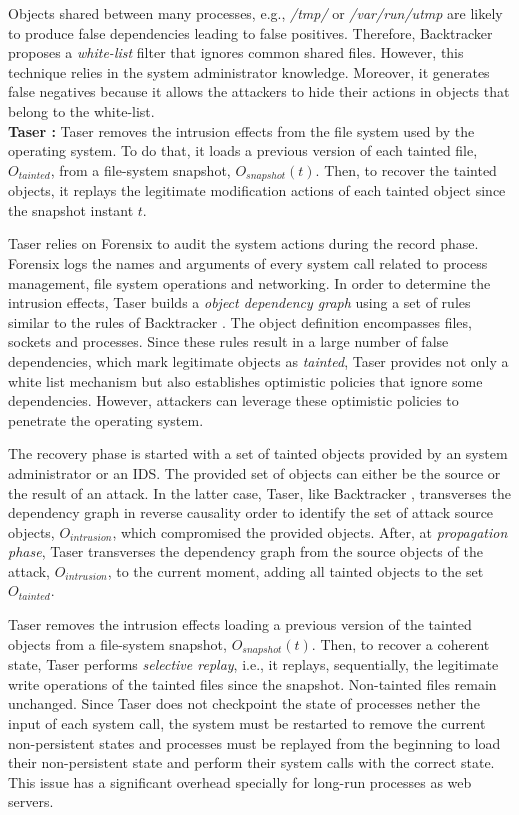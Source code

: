 Objects shared between many processes, e.g., \textit{/tmp/} or \textit{/var/run/utmp} are likely to produce false dependencies leading to false positives. Therefore, Backtracker proposes a \textit{white-list} filter that ignores common shared files. However, this technique relies in the system administrator knowledge. Moreover, it generates false negatives because it allows the attackers to hide their actions in objects that belong to the white-list. \\


\textbf{Taser \cite{taser}:} Taser removes the intrusion effects from the file system used by the operating system. To do that, it loads a previous version of each tainted file, $O_{tainted}$, from a file-system snapshot, $O_{snapshot}(t)$. Then, to recover the tainted objects, it replays the legitimate modification actions of each tainted object since the snapshot instant $t$.

Taser relies on Forensix \cite{forensix} to audit the system actions during the record phase. Forensix logs the names and arguments of every system call related to process management, file system operations and networking. In order to determine the intrusion effects, Taser builds a \textit{object dependency graph} using a set of rules similar to the rules of Backtracker \cite{backtracker}. The object definition encompasses files, sockets and processes. Since these rules result in a large number of false dependencies, which mark legitimate objects as \textit{tainted}, Taser provides not only a white list mechanism but also establishes optimistic policies that ignore some dependencies. However, attackers can leverage these optimistic policies to penetrate the operating system.

The recovery phase is started with a set of tainted objects provided by an system administrator or an \ac{IDS}. The provided set of objects can either be the source or the result of an attack. In the latter case, Taser, like Backtracker \cite{backtracker}, transverses the dependency graph in reverse causality order to identify the set of attack source objects, $O_{intrusion}$, which compromised the provided objects. After, at \textit{propagation phase}, Taser transverses the dependency graph from the source objects of the attack, $O_{intrusion}$, to the current moment, adding all tainted objects to the set $O_{tainted}$.

Taser removes the intrusion effects loading a previous version of the tainted objects from a file-system snapshot, $O_{snapshot}(t)$. Then, to recover a coherent state, Taser performs \textit{selective replay}, i.e., it replays, sequentially, the legitimate write operations of the tainted files since the snapshot. Non-tainted files remain unchanged. Since Taser does not checkpoint the state of processes nether the input of each system call, the system must be restarted to remove the current non-persistent states and processes must be replayed from the beginning to load their non-persistent state and perform their system calls with the correct state. This issue has a significant overhead specially for long-run processes as web servers.


